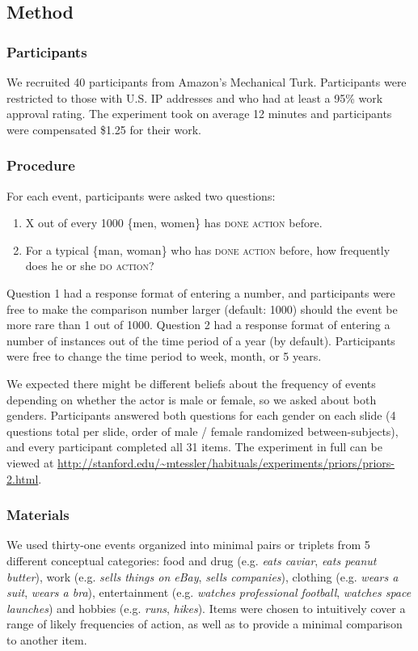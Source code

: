 \documentclass[10pt,letterpaper]{article}
\begin{document}
\subsection{Method}

\subsubsection{Participants}
We recruited 40 participants from Amazon's Mechanical Turk.
Participants were restricted to those with U.S. IP addresses and who had at least a 95\% work approval rating.
The experiment took on average 12 minutes and participants were compensated \$1.25 for their work.

\subsubsection{Procedure}

For each event, participants were asked two questions:
\begin{enumerate}
\item X out of every 1000 \{men, women\} has \textsc{done action} before.
\item For a typical \{man, woman\} who has \textsc{done action} before, how frequently does he or she \textsc{do action}? 
\end{enumerate}

Question 1 had a response format of entering a number, and participants were free to make the comparison number larger (default: 1000) should the event be more rare than 1 out of 1000.
Question 2 had a response format of entering a number of instances out of the time period of a year (by default). Participants were free to change the time period to week, month, or 5 years.

We expected there might be different beliefs about the frequency of events depending on whether the actor is male or female, so we asked about both genders. Participants answered both questions for each gender on each slide (4 questions total per slide, order of male / female randomized between-subjects), and every participant completed all 31 items.
The experiment in full can be viewed at \url{http://stanford.edu/~mtessler/habituals/experiments/priors/priors-2.html}.

\subsubsection{Materials}

We used thirty-one events organized into minimal pairs or triplets from 5 different conceptual categories: food and drug (e.g. \emph{eats caviar}, \emph{eats peanut butter}), work (e.g. \emph{sells things on eBay}, \emph{sells companies}), clothing (e.g. \emph{wears a suit}, \emph{wears a bra}), entertainment (e.g. \emph{watches professional football}, \emph{watches space launches}) and hobbies (e.g. \emph{runs}, \emph{hikes}). 
Items were chosen to intuitively cover a range of likely frequencies of action, as well as to provide a minimal comparison to another item.
\end{document}
